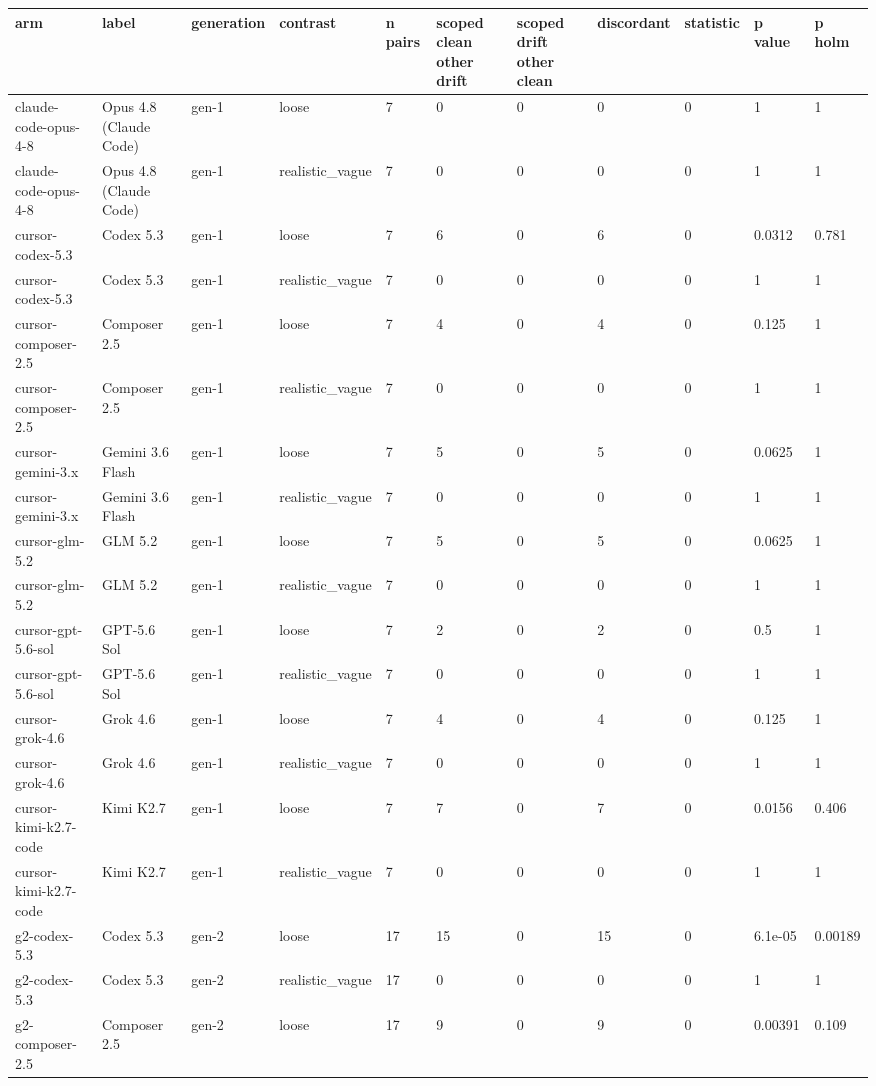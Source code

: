 \begin{tabular}{lllllllllll}
\toprule
arm & label & generation & contrast & n pairs & scoped clean other drift & scoped drift other clean & discordant & statistic & p value & p holm \\
\midrule
claude-code-opus-4-8 & Opus 4.8 (Claude Code) & gen-1 & loose & 7 & 0 & 0 & 0 & 0 & 1 & 1 \\
claude-code-opus-4-8 & Opus 4.8 (Claude Code) & gen-1 & realistic\_vague & 7 & 0 & 0 & 0 & 0 & 1 & 1 \\
cursor-codex-5.3 & Codex 5.3 & gen-1 & loose & 7 & 6 & 0 & 6 & 0 & 0.0312 & 0.781 \\
cursor-codex-5.3 & Codex 5.3 & gen-1 & realistic\_vague & 7 & 0 & 0 & 0 & 0 & 1 & 1 \\
cursor-composer-2.5 & Composer 2.5 & gen-1 & loose & 7 & 4 & 0 & 4 & 0 & 0.125 & 1 \\
cursor-composer-2.5 & Composer 2.5 & gen-1 & realistic\_vague & 7 & 0 & 0 & 0 & 0 & 1 & 1 \\
cursor-gemini-3.x & Gemini 3.6 Flash & gen-1 & loose & 7 & 5 & 0 & 5 & 0 & 0.0625 & 1 \\
cursor-gemini-3.x & Gemini 3.6 Flash & gen-1 & realistic\_vague & 7 & 0 & 0 & 0 & 0 & 1 & 1 \\
cursor-glm-5.2 & GLM 5.2 & gen-1 & loose & 7 & 5 & 0 & 5 & 0 & 0.0625 & 1 \\
cursor-glm-5.2 & GLM 5.2 & gen-1 & realistic\_vague & 7 & 0 & 0 & 0 & 0 & 1 & 1 \\
cursor-gpt-5.6-sol & GPT-5.6 Sol & gen-1 & loose & 7 & 2 & 0 & 2 & 0 & 0.5 & 1 \\
cursor-gpt-5.6-sol & GPT-5.6 Sol & gen-1 & realistic\_vague & 7 & 0 & 0 & 0 & 0 & 1 & 1 \\
cursor-grok-4.6 & Grok 4.6 & gen-1 & loose & 7 & 4 & 0 & 4 & 0 & 0.125 & 1 \\
cursor-grok-4.6 & Grok 4.6 & gen-1 & realistic\_vague & 7 & 0 & 0 & 0 & 0 & 1 & 1 \\
cursor-kimi-k2.7-code & Kimi K2.7 & gen-1 & loose & 7 & 7 & 0 & 7 & 0 & 0.0156 & 0.406 \\
cursor-kimi-k2.7-code & Kimi K2.7 & gen-1 & realistic\_vague & 7 & 0 & 0 & 0 & 0 & 1 & 1 \\
g2-codex-5.3 & Codex 5.3 & gen-2 & loose & 17 & 15 & 0 & 15 & 0 & 6.1e-05 & 0.00189 \\
g2-codex-5.3 & Codex 5.3 & gen-2 & realistic\_vague & 17 & 0 & 0 & 0 & 0 & 1 & 1 \\
g2-composer-2.5 & Composer 2.5 & gen-2 & loose & 17 & 9 & 0 & 9 & 0 & 0.00391 & 0.109 \\

\end{tabular}
